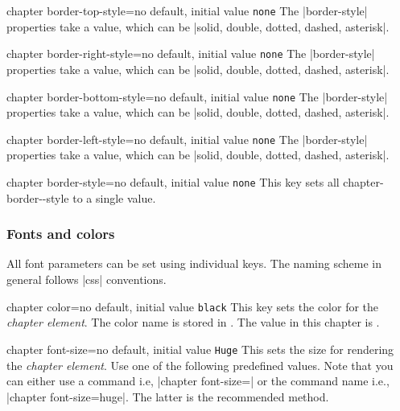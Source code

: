 \begin{docKey}[]{chapter border-top-style}{=}{no default, initial value \texttt{none}}
The |border-style| properties take a value, which can be |solid, double, dotted, dashed, asterisk|.
\end{docKey}

\begin{docKey}[]{chapter border-right-style}{=}{no default, initial value \texttt{none}}
The |border-style| properties take a value, which can be |solid, double, dotted, dashed, asterisk|.
\end{docKey}

\begin{docKey}[]{chapter border-bottom-style}{=}{no default, initial value \texttt{none}}
The |border-style| properties take a value, which can be |solid, double, dotted, dashed, asterisk|.
\end{docKey}

\begin{docKey}[]{chapter border-left-style}{=}{no default, initial value \texttt{none}}
The |border-style| properties take a value, which can be |solid, double, dotted, dashed, asterisk|.
\end{docKey}

\begin{docKey}[phd]{chapter border-style}{=}{no default, initial value \texttt{none}}
This key sets all chapter-border--style to a single value.
\end{docKey}

\subsubsection{Fonts and colors}

All font parameters can be set using individual keys. The naming scheme in general follows |css| conventions.

\begin{docKey}[phd]{chapter color}{=}{no default, initial value \texttt{black}}
This key sets the color for the \textit{chapter element}. The color name is stored in \cmd{\chaptercolor@cx}.
The value in this chapter is \makeatletter\texttt{\chaptercolor@cx}\makeatother.
\end{docKey}

\begin{docKey}[phd]{chapter font-size}{=}{no default, initial value \texttt{Huge}}
This sets the size for rendering the \textit{chapter element}. Use one of the following predefined values.
Note that you can either use a command i.e, |chapter font-size=|\cmd{\huge} 
or the command name i.e., |chapter font-size=huge|. The latter is the recommended method.
\end{docKey}

